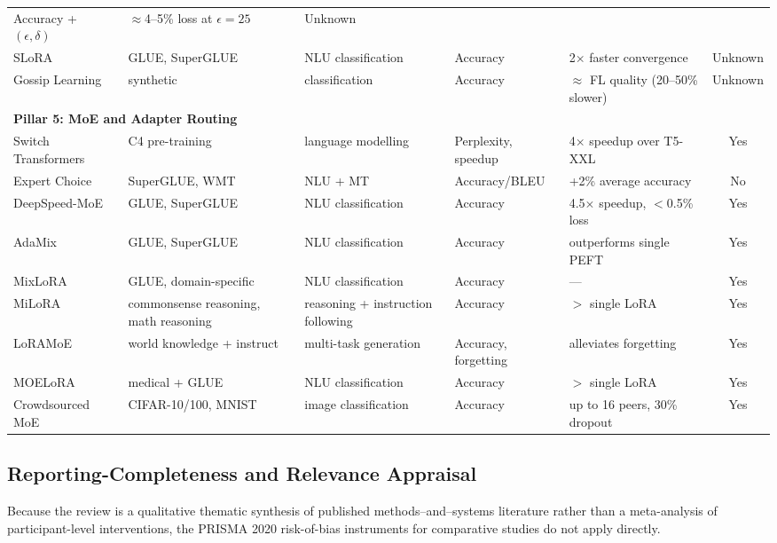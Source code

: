 \begin{table}
{\begin{tabular}{lllllc}
  Accuracy + $(\epsilon,\delta)$ & $\approx$4--5\% loss at $\epsilon=25$ & Unknown \\
  SLoRA~\cite{Babakniya2023} & GLUE, SuperGLUE & NLU classification & Accuracy
  & 2$\times$ faster convergence & Unknown \\
  Gossip Learning~\cite{HegeduisGossip2019} & synthetic & classification &
  Accuracy & $\approx$ FL quality (20--50\% slower) & Unknown \\
  \midrule
  \multicolumn{6}{l}{\textbf{Pillar 5: MoE and Adapter Routing}} \\
  Switch Transformers~\cite{Fedus2022} & C4 pre-training & language modelling &
   Perplexity, speedup & 4$\times$ speedup over T5-XXL & Yes \\
  Expert Choice~\cite{Zhou2022} & SuperGLUE, WMT & NLU + MT & Accuracy/BLEU &
  +2\% average accuracy & No \\
  DeepSpeed-MoE~\cite{RajbhandariDeepSpeed2022} & GLUE, SuperGLUE & NLU
  classification & Accuracy & 4.5$\times$ speedup, $<$0.5\% loss & Yes \\
  AdaMix~\cite{WangAdaMix2022} & GLUE, SuperGLUE & NLU classification &
  Accuracy & outperforms single PEFT & Yes \\
  MixLoRA~\cite{LiMixLoRA2024} & GLUE, domain-specific & NLU classification &
  Accuracy & --- & Yes \\
  MiLoRA~\cite{ZhangMiLoRA2024} & commonsense reasoning, math reasoning &
  reasoning + instruction following & Accuracy & $>$ single LoRA & Yes \\
  LoRAMoE~\cite{DouLoRAMoE2024} & world knowledge + instruct & multi-task
  generation & Accuracy, forgetting & alleviates forgetting & Yes \\
  MOELoRA~\cite{LiuWhenMOE2024} & medical + GLUE & NLU classification &
  Accuracy & $>$ single LoRA & Yes \\
  Crowdsourced MoE~\cite{RyabininCrowdsourced2020} & CIFAR-10/100, MNIST &
  image classification & Accuracy & up to 16 peers, 30\% dropout & Yes \\
\bottomrule
  \end{tabular}
  }
\end{table}

\subsection{Reporting-Completeness and Relevance Appraisal}
\label{sec:methodology:quality}

Because the review is a qualitative thematic synthesis of published
methods--and--systems literature rather than a meta-analysis of participant-level
interventions, the PRISMA 2020 risk-of-bias instruments for comparative studies do
not apply directly.

